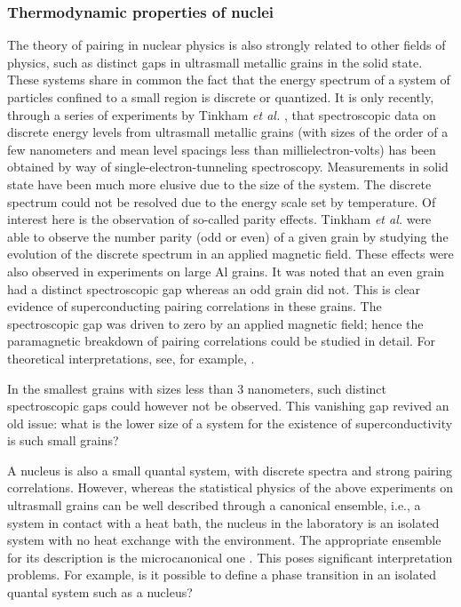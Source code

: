 \documentclass[preprint,rmp,aps,floatfix]{revtex4}
\begin{document}
\subsubsection{Thermodynamic properties of nuclei}

The theory of pairing in nuclear physics is also strongly related 
to other fields of physics, such as distinct gaps in 
ultrasmall metallic grains in the 
solid state. These systems share in 
common the fact that the energy spectrum of a system of particles 
confined to a small region is discrete or quantized. 
It is only recently, through a series of experiments by Tinkham {\em et al.}
\cite{tinkham95,tinkham96,tinkham98}, that spectroscopic data on discrete energy levels from
ultrasmall metallic grains (with sizes of the order of a few nanometers 
and mean level spacings less than millielectron-volts) 
has been
obtained by way of single-electron-tunneling spectroscopy. 
Measurements in solid state have been much more elusive due to the size
of the system. The discrete spectrum could not be resolved due to the 
energy scale set by temperature.
Of interest here is the observation of so-called parity effects. 
Tinkham {\em et al.}
\cite{tinkham95,tinkham96,tinkham98} were able to observe the number parity (odd or even)
of a given grain by studying the evolution of the discrete spectrum 
in an applied magnetic field.
These effects were also observed in experiments on large Al grains.
It was noted that an even grain had a distinct spectroscopic gap 
whereas an odd grain did not. This is clear evidence of superconducting
pairing correlations in these grains.
The spectroscopic gap was driven to zero by an applied magnetic field;
hence the paramagnetic breakdown of pairing correlations could be studied in 
detail. For theoretical interpretations, 
see, for example, \cite{delft2000,balian1999,mastellone98,sierra99}.


In the smallest grains with sizes less than 3 nanometers, such 
distinct spectroscopic gaps could however not be observed. This vanishing gap
revived an old issue: what is the lower size of a system for the existence
of superconductivity is  such small grains? 

A  nucleus is also a small quantal system, with discrete spectra and strong
pairing correlations. However, whereas the statistical physics of the
above experiments on ultrasmall
grains can be well described through a canonical ensemble, i.e., 
a system in contact with a heat bath, the nucleus in the laboratory 
is an isolated system with no heat exchange with the environment.
The appropriate ensemble for its description is the 
microcanonical one \cite{balian1999}.
This poses significant interpretation problems. For example, 
is it possible to define
a phase transition in an isolated quantal system such as a nucleus?  
\end{document}
